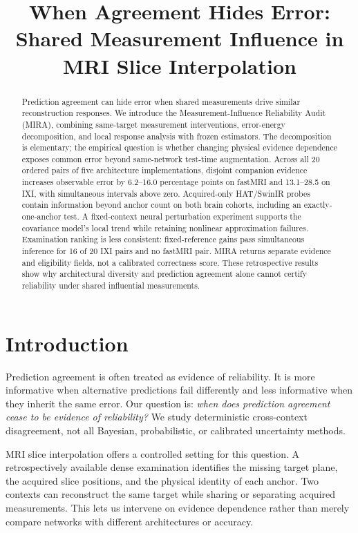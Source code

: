 \documentclass[10pt,twocolumn,letterpaper]{article}
\title{When Agreement Hides Error:\\
Shared Measurement Influence in MRI Slice Interpolation}
\begin{document}
\maketitle

\begin{abstract}
Prediction agreement can hide error when shared measurements drive similar reconstruction responses. We introduce the Measurement-Influence Reliability Audit (MIRA), combining same-target measurement interventions, error-energy decomposition, and local response analysis with frozen estimators. The decomposition is elementary; the empirical question is whether changing physical evidence dependence exposes common error beyond same-network test-time augmentation. Across all 20 ordered pairs of five architecture implementations, disjoint companion evidence increases observable error by 6.2--16.0 percentage points on fastMRI and 13.1--28.5 on IXI, with simultaneous intervals above zero. Acquired-only HAT/SwinIR probes contain information beyond anchor count on both brain cohorts, including an exactly-one-anchor test. A fixed-context neural perturbation experiment supports the covariance model's local trend while retaining nonlinear approximation failures. Examination ranking is less consistent: fixed-reference gains pass simultaneous inference for 16 of 20 IXI pairs and no fastMRI pair. MIRA returns separate evidence and eligibility fields, not a calibrated correctness score. These retrospective results show why architectural diversity and prediction agreement alone cannot certify reliability under shared influential measurements.
\end{abstract}

\section{Introduction}
Prediction agreement is often treated as evidence of reliability. It is more informative when alternative predictions fail differently and less informative when they inherit the same error. Our question is: \emph{when does prediction agreement cease to be evidence of reliability?} We study deterministic cross-context disagreement, not all Bayesian, probabilistic, or calibrated uncertainty methods.

MRI slice interpolation offers a controlled setting for this question. A retrospectively available dense examination identifies the missing target plane, the acquired slice positions, and the physical identity of each anchor. Two contexts can reconstruct the same target while sharing or separating acquired measurements. This lets us intervene on evidence dependence rather than merely compare networks with different architectures or accuracy.
\end{document}
